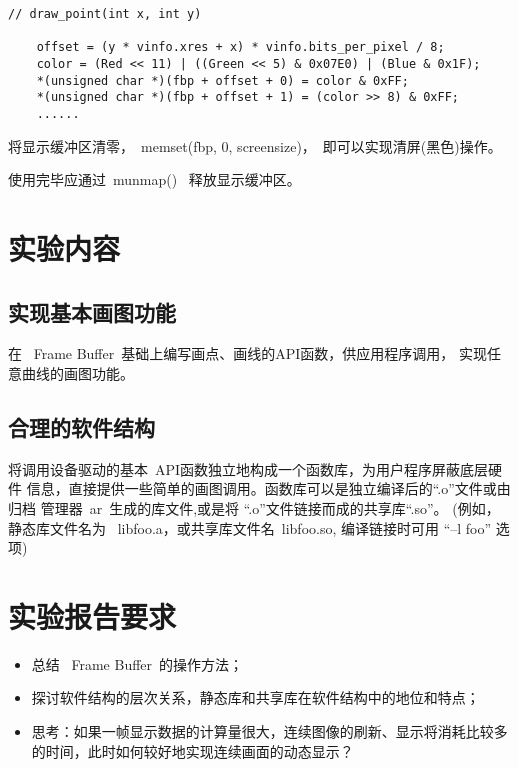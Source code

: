 \begin{boxedminipage}{.9\textwidth}
\begin{verbatim}
// draw_point(int x, int y)

    offset = (y * vinfo.xres + x) * vinfo.bits_per_pixel / 8;
    color = (Red << 11) | ((Green << 5) & 0x07E0) | (Blue & 0x1F);
    *(unsigned char *)(fbp + offset + 0) = color & 0xFF;
    *(unsigned char *)(fbp + offset + 1) = (color >> 8) & 0xFF;
    ......
\end{verbatim}
\end{boxedminipage}

	将显示缓冲区清零，~memset(fbp, 0, screensize)，~即可以实现清屏(黑色)操作。

使用完毕应通过~munmap()~ 释放显示缓冲区。
\section{实验内容}
\subsection{实现基本画图功能}
	在 ~Frame Buffer~基础上编写画点、画线的API函数，供应用程序调用，
实现任意曲线的画图功能。

\subsection{合理的软件结构}
    将调用设备驱动的基本~API函数独立地构成一个函数库，为用户程序屏蔽底层硬件
信息，直接提供一些简单的画图调用。函数库可以是独立编译后的``.o''文件或由归档
管理器~ar~生成的库文件,或是将 ``.o''文件链接而成的共享库``.so''。
(例如，静态库文件名为 ~libfoo.a，或共享库文件名~libfoo.so, 编译链接时可用
``--l foo'' 选项)

\section{实验报告要求}
\begin{itemize}\itemsep=-3pt
  \item 总结 ~Frame Buffer~的操作方法；
  \item 探讨软件结构的层次关系，静态库和共享库在软件结构中的地位和特点；
  \item 思考：如果一帧显示数据的计算量很大，连续图像的刷新、显示将消耗比较多
		的时间，此时如何较好地实现连续画面的动态显示？
\end{itemize}
